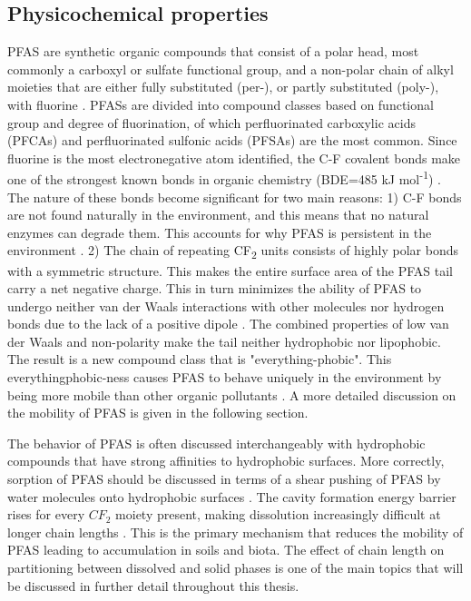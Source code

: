 \subsection{Physicochemical properties}\label{sec:physchem} 
PFAS are synthetic organic compounds that consist of a polar head, most commonly a carboxyl or sulfate functional group, and a non-polar chain of alkyl moieties that are either fully substituted (per-), or partly substituted (poly-), with fluorine \citep{wang2011physchem}. PFASs are divided into compound classes based on functional group and degree of fluorination, of which perfluorinated carboxylic acids (PFCAs) and perfluorinated sulfonic acids (PFSAs) are the most common. Since fluorine is the most electronegative atom identified, the C-F covalent bonds make one of the strongest known bonds in organic chemistry (BDE=485 kJ mol\textsuperscript{-1}) \citep{Lau2007}. The nature of these bonds become significant for two main reasons: 1) C-F bonds are not found naturally in the environment, and this means that no natural enzymes can degrade them. This accounts for why PFAS is persistent in the environment \citep{hale2020persistent,krafft2015per}. 2) The chain of repeating CF\textsubscript{2} units consists of highly polar bonds with a symmetric structure. This makes the  entire surface area of the PFAS tail carry a net negative charge. This in turn minimizes the ability of PFAS to undergo neither van der Waals interactions with other molecules nor hydrogen bonds due to the lack of a positive dipole \citep{Arp2006}. The combined properties of low van der Waals and non-polarity make the tail neither hydrophobic nor lipophobic. The result is a new compound class that is "everything-phobic". This everythingphobic-ness causes PFAS to behave uniquely in the environment by being more mobile than other organic pollutants \citep{hale2020persistent}. A more detailed discussion on the mobility of PFAS is given in the following section.  

The behavior of PFAS is often discussed interchangeably with hydrophobic compounds that have strong affinities to hydrophobic surfaces. More correctly, sorption of PFAS should be discussed in terms of a shear pushing of PFAS by water molecules onto hydrophobic surfaces \citep{Arp2006}. The cavity formation energy barrier rises for every $CF_2$ moiety present, making dissolution increasingly difficult at longer chain lengths \citep{bhhatarai2011,Arp2006}. This is the primary mechanism that reduces the mobility of PFAS leading to accumulation in soils and biota. The effect of chain length on partitioning between dissolved and solid phases is one of the main topics that will be discussed in further detail throughout this thesis.


